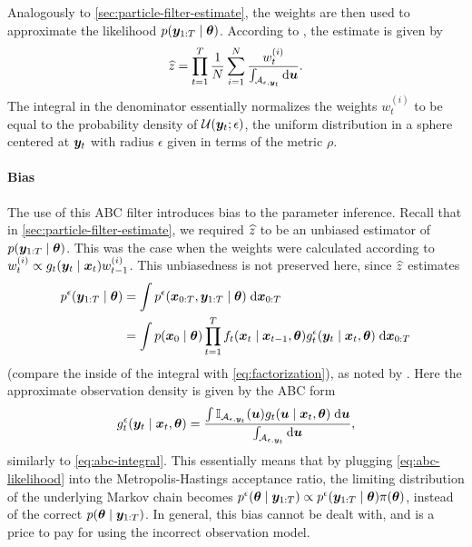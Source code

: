Analogously to \autoref{sec:particle-filter-estimate}, the weights are then used to approximate the likelihood $p(\bm{y}_{1:T} \mid \bm{\theta})$. According to \cite{jasra-time-series}, the estimate is given by
\begin{equation} \label{eq:abc-likelihood}
\widehat{z} = \prod_{t=1}^T \frac{1}{N} \sum_{i=1}^N \frac{w_t^{(i)}}{\int_{\mathcal{A}_{\epsilon, \bm{y}_t}} \mathrm{d}{\bm{u}}}.
\end{equation}
The integral in the denominator essentially normalizes the weights $w_t^{(i)}$ to be equal to the probability density of $\mathcal{U}(\bm{y}_t; \epsilon)$, the uniform distribution in a sphere centered at $\bm{y}_t$ with radius $\epsilon$ given in terms of the metric $\rho$.

\paragraph{Bias}
The use of this ABC filter introduces bias to the parameter inference. Recall that in \autoref{sec:particle-filter-estimate}, we required $\widehat{z}$ to be an unbiased estimator of $p(\bm{y}_{1:T} \mid \bm{\theta})$. This was the case when the weights were calculated according to $w_t^{(i)} \propto g_t(\bm{y}_t \mid \bm{x}_t) w_{t-1}^{(i)}$. This unbiasedness is not preserved here, since $\widehat{z}$ estimates
\begin{equation*}
\begin{split}
p^\epsilon(\bm{y}_{1:T} \mid \bm{\theta}) &= \int p^\epsilon(\bm{x}_{0:T}, \bm{y}_{1:T} \mid \bm{\theta}) \; \mathrm{d}{\bm{x}_{0:T}} \\
&= \int p(\bm{x}_0 \mid \bm{\theta}) \prod_{t=1}^T f_t(\bm{x}_t \mid \bm{x}_{t-1}, \bm{\theta}) g_t^\epsilon(\bm{y}_t \mid \bm{x}_t, \bm{\theta}) \; \mathrm{d}{\bm{x}_{0:T}}
\end{split}
\end{equation*}
(compare the inside of the integral with \eqref{eq:factorization}), as noted by \cite{jasra-time-series}. Here the approximate observation density is given by the ABC form
\begin{equation*}
g_t^\epsilon(\bm{y}_t \mid \bm{x}_t, \bm{\theta}) = \frac{\int \mathbb{I}_{\mathcal{A}_{\epsilon, \bm{y}_t}}(\bm{u}) g_t(\bm{u} \mid \bm{x}_t, \bm{\theta}) \; \mathrm{d}{\bm{u}}}{\int_{\mathcal{A}_{\epsilon, \bm{y}_t}} \mathrm{d}{\bm{u}}},
\end{equation*}
similarly to \eqref{eq:abc-integral}. This essentially means that by plugging \eqref{eq:abc-likelihood} into the Metropolis-Hastings acceptance ratio, the limiting distribution of the underlying Markov chain becomes $p^\epsilon(\bm{\theta} \mid \bm{y}_{1:T}) \propto p^\epsilon(\bm{y}_{1:T} \mid \bm{\theta}) \pi(\bm{\theta})$, instead of the correct $p(\bm{\theta} \mid \bm{y}_{1:T})$. In general, this bias cannot be dealt with, and is a price to pay for using the incorrect observation model.

